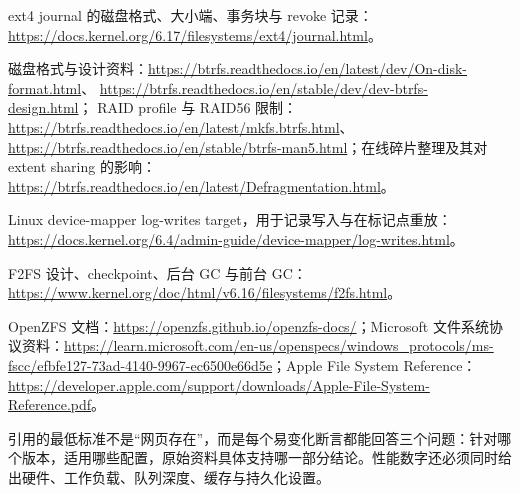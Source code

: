 \begin{description}[leftmargin=2.4em,style=nextline]
\item[ext4 与 jbd2]
ext4 journal 的磁盘格式、大小端、事务块与 revoke 记录：
\url{https://docs.kernel.org/6.17/filesystems/ext4/journal.html}。

\item[Btrfs]
磁盘格式与设计资料：\url{https://btrfs.readthedocs.io/en/latest/dev/On-disk-format.html}、
\url{https://btrfs.readthedocs.io/en/stable/dev/dev-btrfs-design.html}；
RAID profile 与 RAID56 限制：\url{https://btrfs.readthedocs.io/en/latest/mkfs.btrfs.html}、
\url{https://btrfs.readthedocs.io/en/stable/btrfs-man5.html}；在线碎片整理及其对 extent sharing 的影响：
\url{https://btrfs.readthedocs.io/en/latest/Defragmentation.html}。

\item[掉电测试]
Linux device-mapper log-writes target，用于记录写入与在标记点重放：
\url{https://docs.kernel.org/6.4/admin-guide/device-mapper/log-writes.html}。

\item[F2FS]
F2FS 设计、checkpoint、后台 GC 与前台 GC：\url{https://www.kernel.org/doc/html/v6.16/filesystems/f2fs.html}。

\item[开放文件系统文档]
OpenZFS 文档：\url{https://openzfs.github.io/openzfs-docs/}；Microsoft 文件系统协议资料：\url{https://learn.microsoft.com/en-us/openspecs/windows_protocols/ms-fscc/efbfe127-73ad-4140-9967-ec6500e66d5e}；Apple File System Reference：\url{https://developer.apple.com/support/downloads/Apple-File-System-Reference.pdf}。
\end{description}

\begin{rubricbox}
引用的最低标准不是“网页存在”，而是每个易变化断言都能回答三个问题：针对哪个版本，适用哪些配置，原始资料具体支持哪一部分结论。性能数字还必须同时给出硬件、工作负载、队列深度、缓存与持久化设置。
\end{rubricbox}
